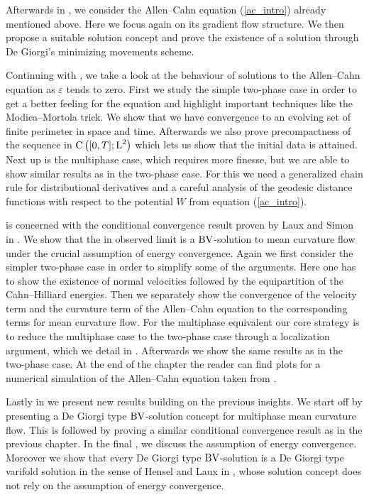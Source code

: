 Afterwards in , we consider the Allen--Cahn 
equation 
(\ref{ac_intro}) already mentioned above. Here we focus again on its 
gradient flow structure. We then propose a suitable solution concept and prove 
the existence of a solution through De Giorgi's minimizing movements scheme.

Continuing with , we take a 
look at the behaviour of solutions to the Allen--Cahn equation as $ 
\varepsilon $ tends to zero. First we study the simple two-phase case in 
order 
to get a better feeling for the equation and highlight important techniques 
like the Modica--Mortola trick. We show that we have convergence to an 
evolving set of finite perimeter in space and time. 
Afterwards we also prove 
precompactness of the sequence in $ \operatorname{C} \left( [ 0 , T ] ; \operatorname{L}^{ 2 } \right) 
$ which 
lets us show that the initial data is attained. 
Next up is the multiphase case, 
which requires more finesse, but we are able to show similar results as 
in the 
two-phase case. 
For this we need a generalized chain rule for distributional 
derivatives and a careful analysis of the geodesic distance functions with 
respect to the potential $ W $ from equation (\ref{ac_intro}).

 is concerned with the conditional 
convergence result proven by Laux and Simon in 
\cite{convergence_of_allen_cahn_equation_to_multiphase_mean_curvature_flow}. 
We show that the in  
observed limit is a $ \operatorname{BV} $-solution to mean curvature flow under the crucial 
assumption of energy convergence. 
Again we first consider the simpler two-phase case in 
order to simplify some of the arguments. Here one has to show the existence of 
normal velocities followed by the equipartition of the Cahn--Hilliard energies. 
Then we separately show the convergence of the velocity term and the curvature 
term 
of the Allen--Cahn equation to the corresponding terms for mean curvature flow. 
For the multiphase equivalent our core strategy is to reduce the 
multiphase case to the two-phase 
case through a localization argument, which we detail in 
. 
Afterwards we show the same results as in the two-phase case. 
At the end of the chapter the reader can find plots for a numerical simulation 
of the Allen--Cahn equation taken from \cite{kuehner_simulation}.

Lastly in  we present new results 
building on the previous insights. We start off by presenting a De Giorgi type 
$ \operatorname{BV} $-solution concept for multiphase mean curvature flow. This is followed 
by proving a similar conditional convergence result as in the previous chapter. 
In the final 
, we discuss the 
assumption of energy convergence. Moreover we show that every De 
Giorgi type $ \operatorname{BV} $-solution is a De Giorgi type varifold solution in the sense 
of Hensel and Laux in 
\cite{hensel_laux_varifold_solution_concept_for_mean_curvature_flow}, whose 
solution concept does not rely on the assumption of energy convergence.






